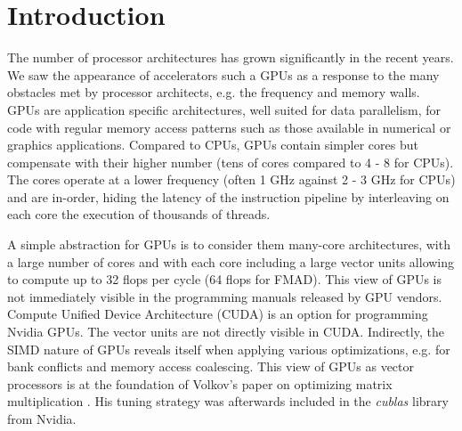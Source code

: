 \section{Introduction}
The number of processor architectures has grown significantly in the recent
years. We saw the appearance of accelerators such a GPUs as a response to the
many obstacles met by processor architects, e.g. the frequency and memory walls.
GPUs are application specific architectures, well suited for data parallelism,
for code with regular memory access patterns such as those available in
numerical or graphics applications. Compared to CPUs, GPUs contain simpler cores
but compensate with their higher number (tens of cores compared to 4 - 8 for
CPUs). The cores operate at a lower frequency (often 1 GHz against 2 - 3 GHz for
CPUs) and are in-order, hiding the latency of the instruction pipeline by
interleaving on each core the execution of thousands of threads.

A simple abstraction for GPUs is to consider them many-core architectures, with
a large number of cores and with each core including a large vector units
allowing to compute up to 32 flops per cycle (64 flops for FMAD). This view of
GPUs is not immediately visible in the programming manuals released by GPU
vendors. Compute Unified Device Architecture (CUDA) is an option for programming
Nvidia GPUs. The vector units are not directly visible in CUDA. Indirectly, the
SIMD nature of GPUs reveals itself when applying various optimizations, e.g. for
bank conflicts and memory access coalescing. This view of GPUs as vector
processors is at the foundation of Volkov's paper on optimizing matrix
multiplication \cite{volkov2008}. His tuning strategy was afterwards included in
the \textit{cublas} library from Nvidia.


